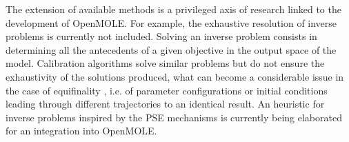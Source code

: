\documentclass[10pt]{article}
\begin{document}
The extension of available methods is a privileged axis of research linked to the development of OpenMOLE. For example, the exhaustive resolution of inverse problems \citep{aster2018parameter} is currently not included. Solving an inverse problem consists in determining all the antecedents of a given objective in the output space of the model. Calibration algorithms solve similar problems but do not ensure the exhaustivity of the solutions produced, what can become a considerable issue in the case of equifinality \citep{rey2015plateforme}, i.e. of parameter configurations or initial conditions leading through different trajectories to an identical result. An heuristic for inverse problems inspired by the PSE mechanisms is currently being elaborated for an integration into OpenMOLE.
\end{document}
